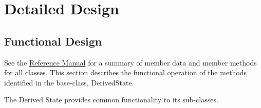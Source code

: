 
%
%
% 
%

\section{Detailed Design}
\label{ref:DerivedState}

\subsection{Functional Design}
See the \href{file:refman.pdf}{Reference Manual}\cite{derivedstatebib:ReferenceManual} for a summary of member data and member methods for all classes.  This section describes the functional operation of the methods identified in the base-class, DerivedState.

The Derived State provides common functionality to its sub-classes.

